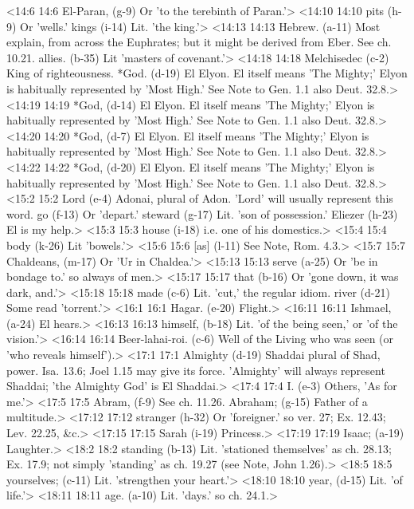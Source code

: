 <14:6 14:6  El-Paran, (g-9)  Or 'to the terebinth of Paran.'>
<14:10 14:10  pits (h-9)  Or 'wells.'
  kings (i-14)  Lit. 'the king.'>
<14:13 14:13  Hebrew. (a-11)  Most explain, from across the Euphrates; but it might be  derived from Eber. See ch. 10.21.
  allies. (b-35)  Lit 'masters of covenant.'>
<14:18 14:18  Melchisedec (c-2)  King of righteousness.
  *God. (d-19)  El Elyon. El itself means 'The Mighty;' Elyon is habitually represented by 'Most High.' See Note to Gen. 1.1 also Deut. 32.8.>
<14:19 14:19  *God, (d-14)  El Elyon. El itself means 'The Mighty;' Elyon is habitually represented by 'Most High.' See Note to Gen. 1.1 also Deut. 32.8.>
<14:20 14:20  *God, (d-7)  El Elyon. El itself means 'The Mighty;' Elyon is habitually represented by 'Most High.' See Note to Gen. 1.1 also Deut. 32.8.>
<14:22 14:22  *God, (d-20)  El Elyon. El itself means 'The Mighty;' Elyon is  habitually represented by 'Most High.' See Note to Gen. 1.1  also Deut. 32.8.>
<15:2 15:2  Lord (e-4)  Adonai, plural of Adon. 'Lord' will usually represent  this word.  go (f-13)  Or 'depart.'  steward (g-17)  Lit. 'son of possession.'  Eliezer (h-23)  El is my help.>
<15:3 15:3  house (i-18)  i.e. one of his domestics.>
<15:4 15:4  body (k-26)  Lit 'bowels.'>
<15:6 15:6  [as] (l-11)  See Note, Rom. 4.3.>
<15:7 15:7  Chaldeans, (m-17)  Or 'Ur in Chaldea.'>
<15:13 15:13  serve (a-25)  Or 'be in bondage to.' so always of men.>
<15:17 15:17  that (b-16)  Or 'gone down, it was dark, and.'>
<15:18 15:18  made (c-6)  Lit. 'cut,' the regular idiom.
  river (d-21)  Some read 'torrent.'>
<16:1 16:1  Hagar. (e-20)  Flight.>
<16:11 16:11  Ishmael, (a-24)  El hears.>
<16:13 16:13  himself, (b-18)  Lit. 'of the being seen,' or 'of the vision.'>
<16:14 16:14  Beer-lahai-roi. (c-6)  Well of the Living who was seen (or 'who reveals himself').>
<17:1 17:1  Almighty (d-19)  Shaddai plural of Shad, power. Isa. 13.6; Joel 1.15 may  give its force. 'Almighty' will always represent Shaddai;  'the Almighty God' is El Shaddai.>
<17:4 17:4  I. (e-3)  Others, 'As for me.'>
<17:5 17:5  Abram, (f-9)  See ch. 11.26.
  Abraham; (g-15)  Father of a multitude.>
<17:12 17:12  stranger (h-32)  Or 'foreigner.' so ver. 27; Ex. 12.43; Lev. 22.25, &c.>
<17:15 17:15  Sarah (i-19)  Princess.>
<17:19 17:19  Isaac; (a-19)  Laughter.>
<18:2 18:2  standing (b-13)  Lit. 'stationed themselves' as ch. 28.13; Ex. 17.9; not  simply 'standing' as ch. 19.27 (see Note, John 1.26).>
<18:5 18:5  yourselves; (c-11)  Lit. 'strengthen your heart.'>
<18:10 18:10  year, (d-15)  Lit. 'of life.'>
<18:11 18:11  age. (a-10)  Lit. 'days.' so ch. 24.1.>
